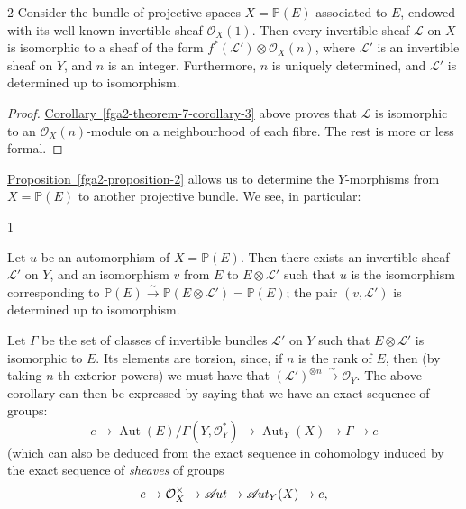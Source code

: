 \begin{proposition}{2}
    Consider the bundle of projective spaces \(X=\mathbb {P}(E)\) associated to \(E\), endowed with its well-known invertible sheaf \(\mathcal {O}_X(1)\).
    Then every invertible sheaf \(\mathscr {L}\) on \(X\) is isomorphic to a sheaf of the form \(f^*(\mathscr {L}')\otimes \mathcal {O}_X(n)\), where \(\mathscr {L}'\) is an invertible sheaf on \(Y\), and \(n\) is an integer.
    Furthermore, \(n\) is uniquely determined, and \(\mathscr {L}'\) is determined up to isomorphism.\begin{proof}\par{}\hyperref[fga2-theorem-7-corollary-3]{Corollary~\ref*{fga2-theorem-7-corollary-3}} above proves that \(\mathscr {L}\) is isomorphic to an \(\mathcal {O}_X(n)\)-module on a neighbourhood of each fibre.
      The rest is more or less formal.\end{proof}\end{proposition}\par{}\hyperref[fga2-proposition-2]{Proposition~\ref*{fga2-proposition-2}} allows us to determine the \(Y\)-morphisms from \(X=\mathbb {P}(E)\) to another projective bundle.
  We see, in particular:\begin{corollary}{1}\label{fga2-proposition-2-corollary-1}\skipsinglepar\par{}Let \(u\) be an automorphism of \(X=\mathbb {P}(E)\).
    Then there exists an invertible sheaf \(\mathscr {L}'\) on \(Y\), and an isomorphism \(v\) from \(E\) to \(E\otimes \mathscr {L}'\) such that \(u\) is the isomorphism corresponding to \(\mathbb {P}(E)\xrightarrow {\sim }\mathbb {P}(E\otimes \mathscr {L}')=\mathbb {P}(E)\);
    the pair \((v,\mathscr {L}')\) is determined up to isomorphism.\end{corollary}\par{}Let \(\Gamma \) be the set of classes of invertible bundles \(\mathscr {L}'\) on \(Y\) such that \(E\otimes \mathscr {L}'\) is isomorphic to \(E\).
  Its elements are torsion, since, if \(n\) is the rank of \(E\), then (by taking \(n\)-th exterior powers) we must have that \((\mathscr {L}')^{\otimes  n}\xrightarrow {\sim }\mathcal {O}_Y\).
  The above corollary can then be expressed by saying that we have an exact sequence of groups:
  \[     e \to  \operatorname {Aut}(E)/\Gamma (Y,\mathcal {O}_Y^*) \to  \operatorname {Aut}_Y(X) \to  \Gamma  \to  e   \]
  (which can also be deduced from the exact sequence in cohomology induced by the exact sequence of \emph{sheaves} of groups
  \[     e \to  \mathcal {O}_X^\times  \to  \mathscr {A}\kern  -1.75pt\mathit {ut} \to  \mathscr {A}\kern  -1.75pt\mathit {ut}_Y(X) \to  e,   \]
